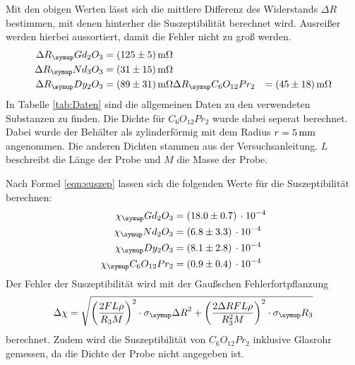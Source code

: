 Mit den obigen Werten lässt sich die mittlere Differenz des Widerstands
$\Delta R$ bestimmen, mit denen hinterher die Suszeptibilität berechnet wird.
Ausreißer werden hierbei aussortiert, damit die Fehler nicht zu groß werden.
\begin{align*}
  \Delta R_\su{Gd_2O_3}    &= (125\pm5) \mOhm \\
  \Delta R_\su{Nd_3O_3}    &= (31\pm15) \mOhm \\
  \Delta R_\su{Dy_2O_3}    &= (89\pm31) \mOhm
  \Delta R_\su{C_6O_{12}Pr_2} &= (45\pm18) \mOhm \\
\end{align*}
In Tabelle \ref{tab:Daten} sind die allgemeinen Daten zu den verwendeten Substanzen
zu finden. Die Dichte für $C_6O_{12}Pr_2$ wurde dabei seperat berechnet. Dabei wurde
der Behälter als zylinderförmig mit dem Radius $r=5\,\si{\milli\meter}$ angenommen. Die anderen Dichten
stammen aus der Versuchsanleitung. $L$ beschreibt die Länge der Probe und $M$ die
Masse der Probe.

Nach Formel \eqref{eqn:suszep} lassen sich die folgenden Werte für die Suszeptibilität
berechnen:
\begin{align*}
  \chi_\su{Gd_2O_3}       &= (18.0 \pm 0.7)\,\cdot10^{-4} \\
  \chi_\su{Nd_2O_3}       &= ( 6.8 \pm 3.3)\,\cdot10^{-4} \\
  \chi_\su{Dy_2O_3}       &= ( 8.1 \pm 2.8)\,\cdot10^{-4} \\ %
  \chi_\su{C_6O_{12}Pr_2} &= ( 0.9 \pm 0.4)\,\cdot10^{-4} \\
\end{align*}
Der Fehler der Suszeptibilität wird mit der Gaußschen Fehlerfortpflanzung
\begin{equation*}
  \Delta\chi = \sqrt{\left(\frac{2FL\rho}{R_3M}\right)^2\cdot\sigma_\su{\Delta R}^2
  + \left(\frac{2\Delta R FL\rho}{R_3^2M}\right)^2\cdot\sigma_\su{R_3}}
\end{equation*}
berechnet. Zudem wird die Suszeptibilität von $C_6O_{12}Pr_2$ inklusive
Glasrohr gemessen, da die Dichte der Probe nicht angegeben ist.

